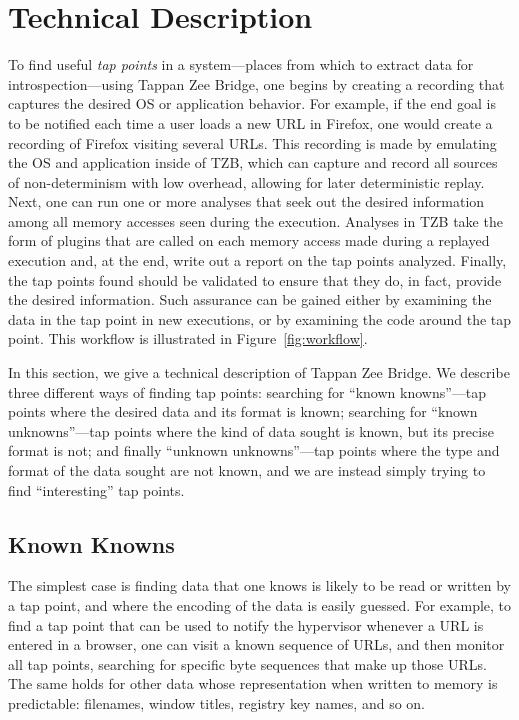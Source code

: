 \section{Technical Description}
\label{sec:technical}

To find useful \emph{tap points} in a system---places from which to
extract data for introspection---using Tappan Zee Bridge, one begins by
creating a recording that captures the desired OS or application
behavior. For example, if the end goal is to be notified each time a
user loads a new URL in Firefox, one would create a recording of Firefox
visiting several URLs. This recording is made by emulating the OS and
application inside of TZB, which can capture and record all sources of
non-determinism with low overhead, allowing for later deterministic
replay. Next, one can run one or more analyses that seek out the desired
information among all memory accesses seen during the execution.
Analyses in TZB take the form of plugins that are called on each memory
access made during a replayed execution and, at the end, write out a
report on the tap points analyzed. Finally, the tap points found should
be validated to ensure that they do, in fact, provide the desired
information. Such assurance can be gained either by examining the data
in the tap point in new executions, or by examining the code around the
tap point. This workflow is illustrated in Figure~\ref{fig:workflow}.

In this section, we give a technical description of Tappan Zee Bridge.
We describe three different ways of finding tap points: searching for
``known knowns''---tap points where the desired data and its format is
known; searching for ``known unknowns''---tap points where the kind of
data sought is known, but its precise format is not; and finally
``unknown unknowns''---tap points where the type and format of the data
sought are not known, and we are instead simply trying to find
``interesting'' tap points.

\subsection{Known Knowns}

The simplest case is finding data that one knows is likely to be read or
written by a tap point, and where the encoding of the data is easily
guessed. For example, to find a tap point that can be used to notify
the hypervisor whenever a URL is entered in a browser, one can visit a
known sequence of URLs, and then monitor all tap points, searching for
specific byte sequences that make up those URLs. The same holds for
other data whose representation when written to memory is predictable:
filenames, window titles, registry key names, and so on.

